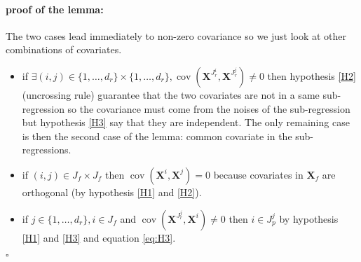 \documentclass[12pt,a4paper]{report}
\begin{document}
\paragraph{proof of the lemma:}
The two cases lead immediately to non-zero covariance so we just look at other combinations of covariates.
\begin{itemize}
	\item if $\exists (i,j)\in \{1,\dots,d_r\}\times \{1,\dots,d_r\}, \operatorname{cov}(\boldsymbol{X}^{J_r^i},\boldsymbol{X}^{J_r^j})\neq 0$ then hypothesis \ref{H2} (uncrossing rule) guarantee that the two covariates are not in a same sub-regression so the covariance must come from the noises of the sub-regression but hypothesis \ref{H3} say that they are independent. The only remaining case is then the second case of the lemma: common covariate in the sub-regressions.
	\item if $(i,j)\in J_f\times J_f$ then  $\operatorname{cov}(\boldsymbol{X}^i,\boldsymbol{X}^j)=0 $ because covariates in $\boldsymbol{X}_f$ are orthogonal (by hypothesis \ref{H1} and \ref{H2}).
	\item if $j \in \{1,\dots,d_r\}, i \in J_f$ and $\operatorname{cov}(\boldsymbol{X}^{J_r^j},\boldsymbol{X}^i)\neq 0$ then $i\in J_p^j$ by hypothesis \ref{H1} and \ref{H3} and equation \ref{eq:H3}.
\end{itemize}
$\square$
\end{document}
